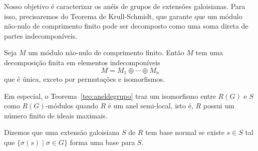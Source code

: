 Nosso objetivo é caracterizar os anéis de grupos de extensões galoisianas. Para isso, precisaremos do Teorema de Krull-Schmidt, que garante que um módulo não-nulo de comprimento finito pode ser decomposto como uma soma direta de partes indecomponíveis. 

\begin{teo*} \cite[Theorem 12.9, p.147]{fuller}
Seja $M$ um módulo não-nulo de comprimento finito. Então $M$ tem uma decomposição finita em elementos indecomponíveis \[M = M_1 \oplus \cdots \oplus M_n\] que é única, exceto por permutações e isomorfismos.
\end{teo*}

Em especial, o Teorema~\ref{teo:aneldegrupo} traz um isomorfismo entre $R(G)$ e $S$ como $R(G)$-módulos quando $R$ é um anel semi-local, isto é, $R$ possui um número finito de ideais maximais.

Dizemos que uma extensão galoisiana $S$ de $R$ tem base normal se existe $s \in S$ tal que $\{\sigma(s) \mid \sigma \in G\}$ forma uma base para $S$.

